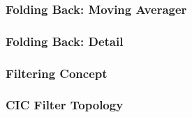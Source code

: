 
\begin{frame}
    \frametitle{Folding Back: Moving Averager}
    \centering
    \begin{overprint}
        
        
        
        
        
        
        
        
        
    \end{overprint}
\end{frame}

\begin{frame}
    \frametitle{Folding Back: Detail}
    \centering
    
\end{frame}

\begin{frame}
    \frametitle{Filtering Concept}
    \centering
    \begin{overprint}
        
        
    \end{overprint}
\end{frame}

\begin{frame}
    \frametitle{CIC Filter Topology}
    \centering
    
\end{frame}

%        
%        
%        
